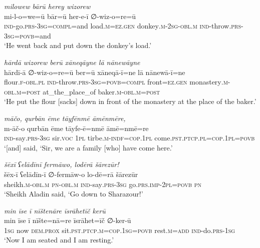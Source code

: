 \ea \label{HB.72}
\textit{milowew bārū herey wizorew} \\ 
\gll mi-l-o=we=ū bār=ū her-e-ī ∅-wiz-o=re=ū \\ 
 \textsc{ind-}go\textsc{.prs}\textsc{-3sg}\textsc{=\textsc{compl}}=and load\textsc{.m}\textsc{=ez}\textsc{.gen} donkey\textsc{.m}-\textsc{2sg}\textsc{-obl}\textsc{.m} \textsc{ind-}throw\textsc{.prs}\textsc{-3sg}\textsc{=\textsc{povb}}=and \\ 
\glt `He went back and put down the donkey’s load.'
\z 
 
\ea \label{HB.73}
\textit{hārdā wizorew berū xāneqāyne lā nānewāyne} \\ 
\gll hārdī-ā ∅-wiz-o=re=ū ber=ū xāneqā-ī=ne lā nānewā-ī=ne \\ 
 flour\textsc{\textsc{.f}}\textsc{-obl}\textsc{.pl} \textsc{ind-}throw\textsc{.prs}\textsc{-3sg}\textsc{=\textsc{povb}}=\textsc{compl} front\textsc{=ez}\textsc{.gen} monastery\textsc{.m}\textsc{-obl}\textsc{.m}\textsc{=\textsc{post}} at\_the\_place\_of baker\textsc{.m}\textsc{-obl}\textsc{.m}\textsc{=\textsc{post}} \\ 
\glt `He put the flour [sacks] down in front of the monastery at the place of the baker.'
\z 
 
\ea \label{PM.11}
\textit{māčo, qurbān ēme tāyfēnmē āmēnmēre,} \\ 
\gll m-āč-o qurbān ēme tāyfe-ē=nmē āmē=nmē=re \\ 
 \textsc{ind-}say\textsc{.prs}\textsc{-3sg} sir.\textsc{voc} \textsc{1pl} tirbe\textsc{.m}\textsc{-indf}\textsc{=cop}\textsc{.1pl} come\textsc{.pst}\textsc{.ptcp}\textsc{.pl}\textsc{=cop}\textsc{.1pl}\textsc{=\textsc{povb}} \\ 
\glt `[and] said, ‘Sir, we are a family [who] have come here.'
\z 
 
\ea \label{PM.16}
\textit{šēxī ʕelādīnī fermāwo, lodērā šārezūr!} \\ 
\gll šēx-ī ʕelādīn-ī ∅-fermāw-o lo-dē=rā šārezūr \\ 
 sheikh\textsc{.m}\textsc{-obl}\textsc{.m} \textsc{pn}\textsc{-obl}\textsc{.m} \textsc{ind-}say\textsc{.prs}\textsc{-3sg} go\textsc{.prs}.\textsc{imp-}\textsc{2pl}\textsc{=\textsc{povb}} \textsc{pn} \\ 
\glt `Sheikh Aladin said, ‘Go down to Sharazour!'
\z 
 
\ea \label{PM.45}
\textit{min īse ī nīštenāre īsrāhetīč kerū} \\ 
\gll min īse ī nīšte=nā=re īsrāhet=īč ∅-ker-ū \\ 
 \textsc{1sg} now \textsc{dem.prox} sit\textsc{.pst}\textsc{.ptcp}\textsc{.m}\textsc{=cop}\textsc{.\textsc{1sg}}\textsc{=\textsc{povb}} rest\textsc{.m}\textsc{=add} \textsc{ind-}do\textsc{.prs}\textsc{-\textsc{1sg}} \\ 
\glt `Now I am seated and I am resting.'
\z 
 

